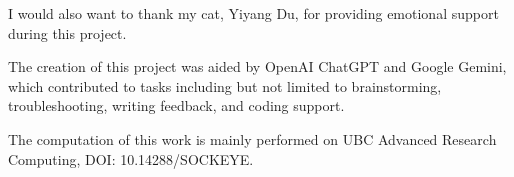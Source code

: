 \documentclass{article}
\begin{document}
I would also want to thank my cat, Yiyang Du, for providing emotional support during this project. 

The creation of this project was aided by OpenAI ChatGPT and Google Gemini, which contributed to tasks including but not limited to brainstorming, troubleshooting, writing feedback, and coding support.

The computation of this work is mainly performed on UBC Advanced Research Computing, DOI: 10.14288/SOCKEYE.

\printbibliography
\end{document}
